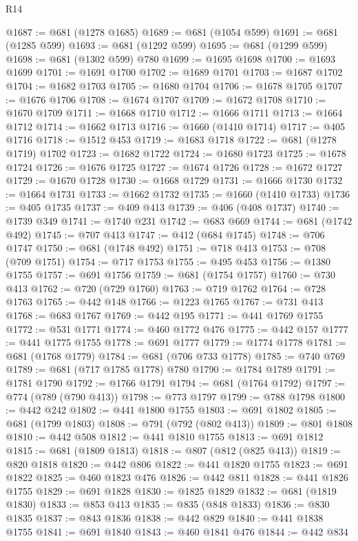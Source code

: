 \begin{lexlean}{R14}
\begin{coremodule}
@1687 := @681 (@1278 @1685)
@1689 := @681 (@1054 @599)
@1691 := @681 (@1285 @599)
@1693 := @681 (@1292 @599)
@1695 := @681 (@1299 @599)
@1698 := @681 (@1302 @599) @780
@1699 := @1695 @1698
@1700 := @1693 @1699
@1701 := @1691 @1700
@1702 := @1689 @1701
@1703 := @1687 @1702
@1704 := @1682 @1703
@1705 := @1680 @1704
@1706 := @1678 @1705
@1707 := @1676 @1706
@1708 := @1674 @1707
@1709 := @1672 @1708
@1710 := @1670 @1709
@1711 := @1668 @1710
@1712 := @1666 @1711
@1713 := @1664 @1712
@1714 := @1662 @1713
@1716 := @1660 (@1410 @1714)
@1717 := @405 @1716
@1718 := @1512 @453
@1719 := @1683 @1718
@1722 := @681 (@1278 @1719) @1702
@1723 := @1682 @1722
@1724 := @1680 @1723
@1725 := @1678 @1724
@1726 := @1676 @1725
@1727 := @1674 @1726
@1728 := @1672 @1727
@1729 := @1670 @1728
@1730 := @1668 @1729
@1731 := @1666 @1730
@1732 := @1664 @1731
@1733 := @1662 @1732
@1735 := @1660 (@1410 @1733)
@1736 := @405 @1735
@1737 := @409 @413
@1739 := @406 (@408 @1737)
@1740 := @1739 @349
@1741 := @1740 @231
@1742 := @683 @669
@1744 := @681 (@1742 @492)
@1745 := @707 @413
@1747 := @412 (@684 @1745)
@1748 := @706 @1747
@1750 := @681 (@1748 @492)
@1751 := @718 @413
@1753 := @708 (@709 @1751)
@1754 := @717 @1753
@1755 := @495 @453
@1756 := @1380 @1755
@1757 := @691 @1756
@1759 := @681 (@1754 @1757)
@1760 := @730 @413
@1762 := @720 (@729 @1760)
@1763 := @719 @1762
@1764 := @728 @1763
@1765 := @442 @148
@1766 := @1223 @1765
@1767 := @731 @413
@1768 := @683 @1767
@1769 := @442 @195
@1771 := @441 @1769 @1755
@1772 := @531 @1771
@1774 := @460 @1772 @476
@1775 := @442 @157
@1777 := @441 @1775 @1755
@1778 := @691 @1777
@1779 := @1774 @1778
@1781 := @681 (@1768 @1779)
@1784 := @681 (@706 @733 @1778)
@1785 := @740 @769
@1789 := @681 (@717 @1785 @1778) @780
@1790 := @1784 @1789
@1791 := @1781 @1790
@1792 := @1766 @1791
@1794 := @681 (@1764 @1792)
@1797 := @774 (@789 (@790 @413))
@1798 := @773 @1797
@1799 := @788 @1798
@1800 := @442 @242
@1802 := @441 @1800 @1755
@1803 := @691 @1802
@1805 := @681 (@1799 @1803)
@1808 := @791 (@792 (@802 @413))
@1809 := @801 @1808
@1810 := @442 @508
@1812 := @441 @1810 @1755
@1813 := @691 @1812
@1815 := @681 (@1809 @1813)
@1818 := @807 (@812 (@825 @413))
@1819 := @820 @1818
@1820 := @442 @806
@1822 := @441 @1820 @1755
@1823 := @691 @1822
@1825 := @460 @1823 @476
@1826 := @442 @811
@1828 := @441 @1826 @1755
@1829 := @691 @1828
@1830 := @1825 @1829
@1832 := @681 (@1819 @1830)
@1833 := @853 @413
@1835 := @835 (@848 @1833)
@1836 := @830 @1835
@1837 := @843 @1836
@1838 := @442 @829
@1840 := @441 @1838 @1755
@1841 := @691 @1840
@1843 := @460 @1841 @476
@1844 := @442 @834

\end{coremodule}
\end{lexlean}
